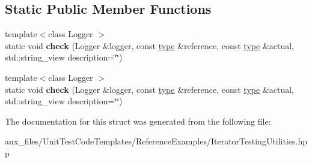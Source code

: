 \subsection*{Static Public Member Functions}
\begin{DoxyCompactItemize}
\item 
\mbox{\label{structsequoia_1_1unit__testing_1_1details__checker_3_01utilities_1_1iterator_01_4_a55988fd834b0bf1bce2ee5c50ba330ce}} 
{\footnotesize template$<$class Logger $>$ }\\static void {\bfseries check} (Logger \&logger, const \mbox{\hyperlink{classsequoia_1_1utilities_1_1iterator}{type}} \&reference, const \mbox{\hyperlink{classsequoia_1_1utilities_1_1iterator}{type}} \&actual, std\+::string\+\_\+view description=\char`\"{}\char`\"{})
\item 
\mbox{\label{structsequoia_1_1unit__testing_1_1details__checker_3_01utilities_1_1iterator_01_4_a55988fd834b0bf1bce2ee5c50ba330ce}} 
{\footnotesize template$<$class Logger $>$ }\\static void {\bfseries check} (Logger \&logger, const \mbox{\hyperlink{classsequoia_1_1utilities_1_1iterator}{type}} \&reference, const \mbox{\hyperlink{classsequoia_1_1utilities_1_1iterator}{type}} \&actual, std\+::string\+\_\+view description=\char`\"{}\char`\"{})
\end{DoxyCompactItemize}


The documentation for this struct was generated from the following file\+:\begin{DoxyCompactItemize}
\item 
aux\+\_\+files/\+Unit\+Test\+Code\+Templates/\+Reference\+Examples/Iterator\+Testing\+Utilities.\+hpp\end{DoxyCompactItemize}
